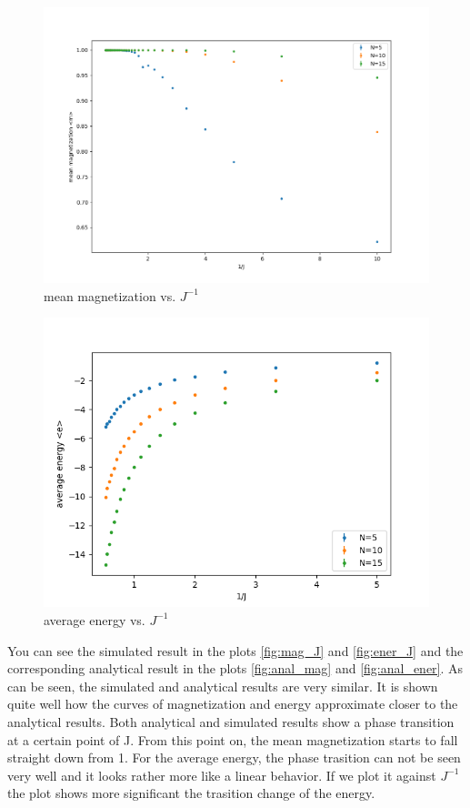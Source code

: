 \documentclass{article}
\begin{document}
\begin{enumerate}
\begin{figure}[htbp]
    \centering
    \includegraphics[width = .8\linewidth]{mag_vs_J^-1.png}
    \caption{mean magnetization vs. $J^{-1}$}
    \label{fig:mag_J-1}
\end{figure}
\begin{figure}[htbp]
    \centering
    \includegraphics[width = .8\linewidth]{energy_vs_J^-1.png}
    \caption{average energy vs. $J^{-1}$}
    \label{fig:ener_J-1}
\end{figure}

You can see the simulated result in the plots \ref{fig:mag_J} and \ref{fig:ener_J} and the corresponding analytical result in the plots \ref{fig:anal_mag} and \ref{fig:anal_ener}. As can be seen, the simulated and analytical results are very similar. It is shown quite well how the curves of magnetization and energy approximate closer to the analytical results. 
Both analytical and simulated results show a phase transition at a certain point of J. From this point on, the mean magnetization starts to fall straight down from 1. For the average energy, the phase trasition can not be seen very well and it looks rather more like a linear behavior. If we plot it against $J^{-1}$ the plot shows more significant the trasition change of the energy.    

\end{enumerate}
\end{document}
